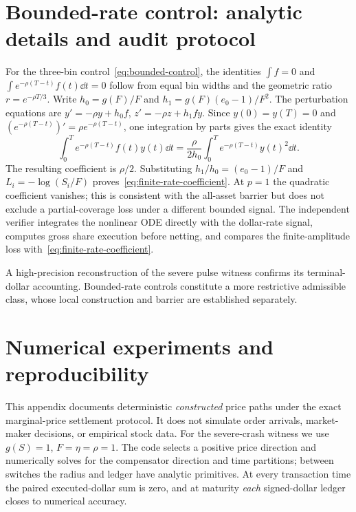 \documentclass[review,hidelinks,onefignum,onetabnum]{siamonline250211}
\begin{document}
\section{Bounded-rate control: analytic details and audit protocol}\label{app:rate}
For the three-bin control~\eqref{eq:bounded-control}, the identities $\int f=0$ and $\int e^{-\rho(T-t)}f(t)\dd t=0$ follow from equal bin widths and the geometric ratio $r=e^{-\rho T/3}$. Write $h_0=g(F)/F$ and $h_1=g(F)(e_0-1)/F^2$. The perturbation equations are $y'=-\rho y+h_0 f$, $z'=-\rho z+h_1fy$. Since $y(0)=y(T)=0$ and $(e^{-\rho(T-t)})'=\rho e^{-\rho(T-t)}$, one integration by parts gives the exact identity
\begin{equation}\label{eq:ibp}
\int_0^T e^{-\rho(T-t)}f(t)y(t)\dd t
=\frac{\rho}{2h_0}\int_0^T e^{-\rho(T-t)}y(t)^2\dd t.
\end{equation}
The resulting coefficient is $\rho/2$. Substituting $h_1/h_0=(e_0-1)/F$ and $L_i=-\log(S_i/F)$ proves~\eqref{eq:finite-rate-coefficient}. At $p=1$ the quadratic coefficient vanishes; this is consistent with the all-asset barrier but does not exclude a partial-coverage loss under a different bounded signal. The independent verifier integrates the nonlinear ODE directly with the dollar-rate signal, computes gross share execution before netting, and compares the finite-amplitude loss with~\eqref{eq:finite-rate-coefficient}.

A high-precision reconstruction of the severe pulse witness confirms its terminal-dollar accounting. Bounded-rate controls constitute a more restrictive admissible class, whose local construction and barrier are established separately.

\section{Numerical experiments and reproducibility}\label{app:numerics}
This appendix documents deterministic \emph{constructed} price paths under the exact marginal-price settlement protocol. It does not simulate order arrivals, market-maker decisions, or empirical stock data. For the severe-crash witness we use $g(S)=1$, $F=\eta=\rho=1$. The code selects a positive price direction and numerically solves for the compensator direction and time partitions; between switches the radius and ledger have analytic primitives. At every transaction time the paired executed-dollar sum is zero, and at maturity \emph{each} signed-dollar ledger closes to numerical accuracy.
\end{document}

